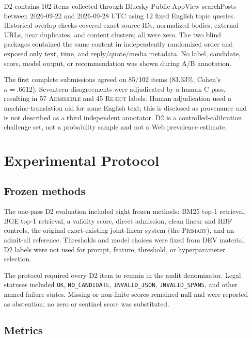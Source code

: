 \documentclass[5p,times]{elsarticle}
\newcommand{\admissible}{\mbox{\textsc{Admissible}}}
\newcommand{\reject}{\mbox{\textsc{Reject}}}
\newcommand{\primary}{\mbox{\textsc{Primary}}}
\begin{document}
D2 contains 102 items collected through Bluesky Public AppView searchPosts between 2026-09-22 and 2026-09-28 UTC using 12 fixed English topic queries. Historical overlap checks covered exact source IDs, normalized bodies, external URLs, near duplicates, and content clusters; all were zero. The two blind packages contained the same content in independently randomized order and exposed only text, time, and reply/quote/media metadata. No label, candidate, score, model output, or recommendation was shown during A/B annotation.

The first complete submissions agreed on 85/102 items ($83.33\%$, Cohen's $\kappa=.6612$). Seventeen disagreements were adjudicated by a human C pass, resulting in 57 \admissible{} and 45 \reject{} labels. Human adjudication used a machine-translation aid for some English text; this is disclosed as provenance and is not described as a third independent annotator. D2 is a controlled-calibration challenge set, not a probability sample and not a Web prevalence estimate.

\section{Experimental Protocol}
\label{sec:protocol}

\subsection{Frozen methods}

The one-pass D2 evaluation included eight frozen methods: BM25 top-1 retrieval, BGE top-1 retrieval, a validity score, direct admission, clean linear and RBF controls, the original exact-existing joint-linear system (the \primary{}), and an admit-all reference. Thresholds and model choices were fixed from DEV material. D2 labels were not used for prompt, feature, threshold, or hyperparameter selection.

The protocol required every D2 item to remain in the audit denominator. Legal statuses included \texttt{OK}, \texttt{NO\_CANDIDATE}, \texttt{INVALID\_JSON}, \texttt{INVALID\_SPANS}, and other named failure states. Missing or non-finite scores remained null and were reported as abstention; no zero or sentinel score was substituted.

\subsection{Metrics}
\end{document}
